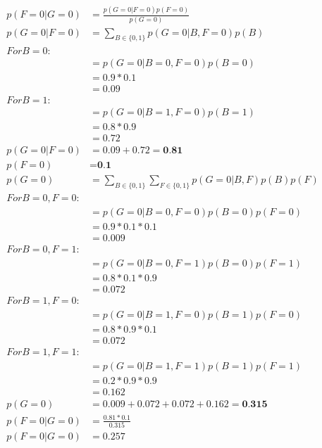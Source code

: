 \documentclass{article}
\begin{document}
\begin{align*}
p(F=0|G=0) & =\frac{p(G=0|F=0)p(F=0)}{p(G=0)} \\
    p(G=0|F=0) & = \sum_{B\in \{0,1\}} p(G=0|B,F=0)p(B) \\
    For B=0: \\
    & = p(G=0|B=0,F=0)p(B=0) \\    
    & = 0.9 * 0.1 \\
    & = 0.09 \\
    For B=1: \\
    &= p(G=0|B=1,F=0)p(B=1) \\   
    & = 0.8 * 0.9 \\
    & = 0.72 \\
p(G=0|F=0) & = 0.09 + 0.72 = \textbf{0.81} \\  
p(F=0) & = \textbf{0.1} \\
p(G=0) & =  \sum_{B\in \{0,1\}}  \sum_{F\in \{0,1\}}  p(G=0|B,F)  p(B)  p(F) \\ 
For B=0, F=0: \\
     & = p(G=0|B=0,F=0)  p(B=0)  p(F=0) \\
    &= 0.9 * 0.1 * 0.1 \\
    & = 0.009 \\
For B=0, F=1: \\
     & = p(G=0|B=0,F=1)  p(B=0)  p(F=1) \\
    &= 0.8 * 0.1 * 0.9 \\
    & = 0.072 \\
For B=1, F=0: \\
     & = p(G=0|B=1,F=0)  p(B=1)  p(F=0) \\
    &= 0.8 * 0.9 * 0.1 \\
    & = 0.072 \\ 
For B=1, F=1: \\
     & = p(G=0|B=1,F=1)  p(B=1)  p(F=1) \\
    &= 0.2 * 0.9 * 0.9 \\
    & = 0.162 \\    
p(G=0) &= 0.009 + 0.072 + 0.072 + 0.162 = \textbf{0.315} \\
p(F=0|G=0) & =\frac{0.81*0.1}{0.315} \\
p(F=0|G=0) & = 0.257 \\
\end{align*}
\end{document}
